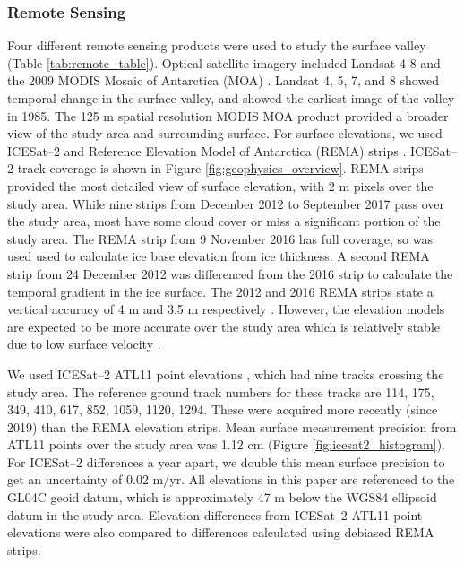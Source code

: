 \subsubsection{Remote Sensing} \label{sec:remote}

Four different remote sensing products were used to study the surface valley (Table \ref{tab:remote_table}). Optical satellite imagery included Landsat 4-8 \citep{RoyLandsat8Scienceproduct2014} and the 2009 MODIS Mosaic of Antarctica (MOA) \citep{haran2014modis}. Landsat 4, 5, 7, and 8 showed temporal change in the surface valley, and showed the earliest image of the valley in 1985. The 125 m spatial resolution MODIS MOA product provided a broader view of the study area and surrounding surface. For surface elevations, we used ICESat--2 and Reference Elevation Model of Antarctica (REMA) strips \citep{howat2019reference,smith2021v3}. ICESat--2 track coverage is shown in Figure \ref{fig:geophysics_overview}. REMA strips provided the most detailed view of surface elevation, with 2 m pixels over the study area. While nine strips from December 2012 to September 2017 pass over the study area, most have some cloud cover or miss a significant portion of the study area. The REMA strip from 9 November 2016 has full coverage, so was used used to calculate ice base elevation from ice thickness. A second REMA strip from 24 December 2012 was differenced from the 2016 strip to calculate the temporal gradient in the ice surface.
The 2012 and 2016 REMA strips state a vertical accuracy of 4 m and 3.5 m respectively \cite{noh2015automated,howat2019reference}. However, the elevation models are expected to be more accurate over the study area which is relatively stable due to low surface velocity \cite{rignot2017measures}.

We used ICESat--2 ATL11 point elevations \citep{smith2021v3}, which had nine tracks crossing the study area. The reference ground track numbers for these tracks are 114,  175,  349,  410,  617,  852, 1059, 1120, 1294. These were acquired more recently (since 2019) than the REMA elevation strips. Mean surface measurement precision from ATL11 points over the study area was 1.12 cm (Figure \ref{fig:icesat2_histogram}). For ICESat--2 differences a year apart, we double this mean surface precision to get an uncertainty of 0.02 m/yr.  All elevations in this paper are referenced to the GL04C geoid datum, which is approximately 47 m below the WGS84 ellipsoid datum in the study area.  Elevation differences from ICESat--2 ATL11 point elevations were also compared to differences calculated using debiased REMA strips.

